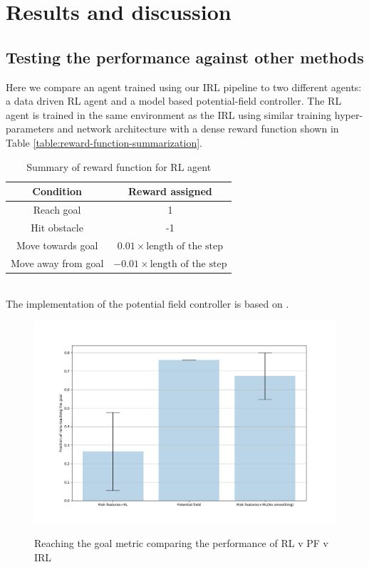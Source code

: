 \section*{Results and discussion}
\subsection*{Testing the performance against other methods}
Here we compare an agent trained using our IRL pipeline to two different agents: a data driven RL agent and a model based potential-field controller. The RL agent is trained in the same environment as the IRL using similar training hyper-parameters and network architecture with a dense reward function shown in Table  \ref{table:reward-function-summarization}.
\begin{table}
	\caption{Summary of reward function for RL agent}
	\begin{center}
		\renewcommand{\arraystretch}{1.3}
		\begin{tabular}{|c|c|}
		\hline
		Condition & Reward assigned \\
		\hline
		Reach goal & 1 \\
		Hit obstacle & -1 \\
		Move towards goal & $0.01 \times \text{length of the step}$ \\
		Move away from goal & $ -0.01 \times \text{length of the step}$\\
		\hline
		\end{tabular}
	\end{center}
	\label{tab:reward-function-summarization}
\end{table}\\
\vspace{5cm}
The implementation of the potential field controller is based on \cite{khatib-potential-field}.\\  
\begin{figure}
	\centering
	\caption{Reaching the goal metric comparing the performance of RL v PF v IRL}
		\includegraphics[width=0.6\linewidth]{plots/inter_method/goal_reached.png}
	\label{fig:inter-method-reach-goal}
\end{figure}\\
